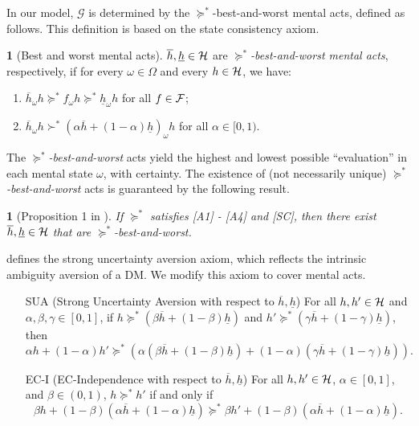 \documentclass[11pt,oneside]{article}
\theoremstyle{plain}
\theoremstyle{plain}
\theoremstyle{plain}
\theoremstyle{plain}
\theoremstyle{plain}
\theoremstyle{definition}
\newtheorem{defn}[thm]{\protect\definitionname}
\theoremstyle{definition}
\theoremstyle{remark}
\theoremstyle{plain}
\newtheorem{lem}[thm]{\protect\lemmaname}
\providecommand{\definitionname}{Definition}
\providecommand{\lemmaname}{Lemma}
\newcommand{\F}{{\cal F}}
\newcommand{\ulh}{\underline{h}}
\newcommand{\olh}{\overline{h}}
\newcommand{\pfs}{\succeq^*}
\newcommand{\convmix}[2]{\alpha #1 + (1-\alpha) #2}
\newcommand{\convexmix}[3]{#3 #1 + (1-#3) #2}
\newcommand{\omix}[2]{#1_\omega #2 }
\begin{document}
In our model, $\mathcal{G}$ is determined by the $\pfs$-best-and-worst mental acts, defined as follows.
This definition is based on the state consistency axiom.

\begin{defn}[Best and worst mental acts]
    \label{defn:best-worst}
    $\overline{h},\underline{h} \in {\cal H}$ are \emph{$\pfs$-best-and-worst mental acts}, respectively, if for every $\omega \in \Omega$ and every $h \in {\cal H}$, we have:
    \begin{enumerate}
        \item $\omix{\overline{h}}{h} \pfs \omix{f}{h} \pfs \omix{\underline{h}}{h}$ for all $f \in \F$;
        \item $\omix{\overline{h}}{h} \succ^* \omix{\left(\convmix{\overline{h}}{\underline{h}}\right)}{h}$ for all $\alpha \in [0, 1)$.
    \end{enumerate}
    \end{defn}

The \emph{$\pfs$-best-and-worst} acts yield the highest and lowest possible ``evaluation'' in each mental state $\omega$, with certainty. The existence of (not necessarily unique) \emph{$\pfs$-best-and-worst} acts is guaranteed by the following result.

\begin{lem}[Proposition 1 in \cite{hill2019non}]
    \label{lem:best-worst}
    If $\pfs$ satisfies [A1] - [A4] and [SC], then there exist $\overline{h},\underline{h} \in {\cal H}$ that are $\pfs$-best-and-worst.
\end{lem}

\cite{hill2019non} defines the strong uncertainty aversion axiom, which reflects the intrinsic ambiguity aversion of a DM.
We modify this axiom to cover mental acts.

%
\begin{itemize}
    \item[SUA] (Strong Uncertainty Aversion with respect to $\overline{h}, \underline{h}$) For all $h,h' \in {\cal H}$ and $\alpha, \beta, \gamma \in [0,1]$,
    if $h \pfs \left(\beta \overline{h} + (1-\beta) \underline{h}\right)$ and $h' \pfs \left(\gamma \overline{h} + (1-\gamma) \underline{h}\right)$, 
    then $$\convmix{h}{h'} \pfs \left(\convmix{\left(\beta \overline{h} + (1-\beta)\underline{h}\right)}{\left(\gamma \overline{h} + (1-\gamma) \underline{h}\right)}\right).$$ 
    \item [EC-I] (EC-Independence with respect to $\olh,\ulh$) For all $h,h' \in {\cal H}$, $\alpha \in [0,1]$, and $\beta \in(0,1)$, $h \pfs h'$ if and only if 
    $$
    \convexmix{h}{\left(\convmix{\olh}{\ulh}\right)}{\beta} \pfs \convexmix{h'}{\left(\convmix{\olh}{\ulh}\right)}{\beta}.
    $$
\end{itemize}
%
\end{document}

